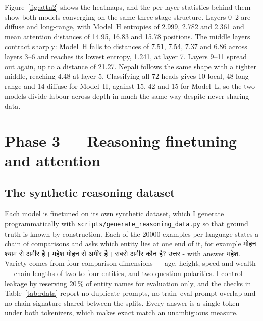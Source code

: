 \documentclass[10pt,a4paper]{article}
\newcommand{\dev}[1]{{\devanagarifont #1}}
\newcommand{\pc}[1]{#1\,\%}
\begin{document}
Figure~\ref{fig:attn2} shows the heatmaps, and the per-layer statistics behind
them show both models converging on the same three-stage structure. Layers 0--2 are diffuse and long-range, with Model~H entropies of
2.999, 2.782 and 2.361 and mean attention distances of 14.95, 16.83 and 15.78
positions. The middle layers contract sharply: Model~H falls to distances of
7.51, 7.54, 7.37 and 6.86 across layers 3--6 and reaches its lowest entropy,
1.241, at layer 7. Layers 9--11 spread out again, up to a distance of 21.27.
Nepali follows the same shape with a tighter middle, reaching 4.48 at layer 5.
Classifying all \num{72} heads gives \num{10} local, \num{48} long-range and
\num{14} diffuse for Model~H, against \num{15}, \num{42} and \num{15} for
Model~L, so the two models divide labour across depth in much the same way
despite never sharing data.

\section{Phase 3 --- Reasoning finetuning and attention}\label{sec:p3}

\subsection{The synthetic reasoning dataset}

Each model is finetuned on its own synthetic dataset, which I generate
programmatically with \texttt{scripts/generate\_reasoning\_data.py} so that ground
truth is known by construction. Each of the \num{20000} examples per language states a chain of
comparisons and asks which entity lies at one end of it, for example
\dev{मोहन श्याम से अमीर है। महेश मोहन से अमीर है। सबसे अमीर कौन है? उत्तर -} with
answer \dev{महेश}. Variety comes from four comparison dimensions --- age, height,
speed and wealth --- chain lengths of two to four entities, and two question
polarities. I control leakage by reserving \pc{20} of entity names for evaluation only, and the checks in Table~\ref{tab:rdata} report no duplicate
prompts, no train--eval prompt overlap and no chain signature shared between the
splits. Every answer is a single token under both tokenizers, which makes exact
match an unambiguous measure.
\end{document}
